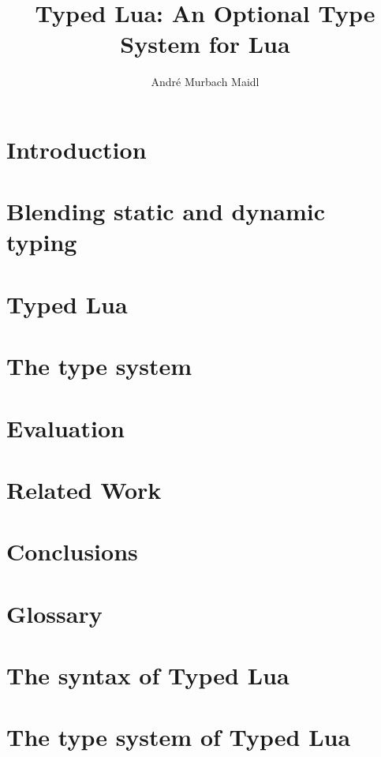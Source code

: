 \documentclass[phd,oneside,british]{ThesisPUC_uk}
\author{André Murbach Maidl}
\title{Typed Lua: An Optional Type System for Lua}
\begin{document}
\chapter{Introduction}
\label{chap:intro}
%

\chapter{Blending static and dynamic typing}
\label{chap:review}
%

\chapter{Typed Lua}
\label{chap:typedlua}
%

\chapter{The type system}
\label{chap:system}
%

\chapter{Evaluation}
\label{chap:evaluation}
%

\chapter{Related Work}
\label{chap:related}
%

\chapter{Conclusions}
\label{chap:conc}
%



\appendix

\chapter{Glossary}
\label{app:glossary}
%

\chapter{The syntax of Typed Lua}
\label{app:syntax}
%

\chapter{The type system of Typed Lua}
\label{app:rules}
%
\end{document}

